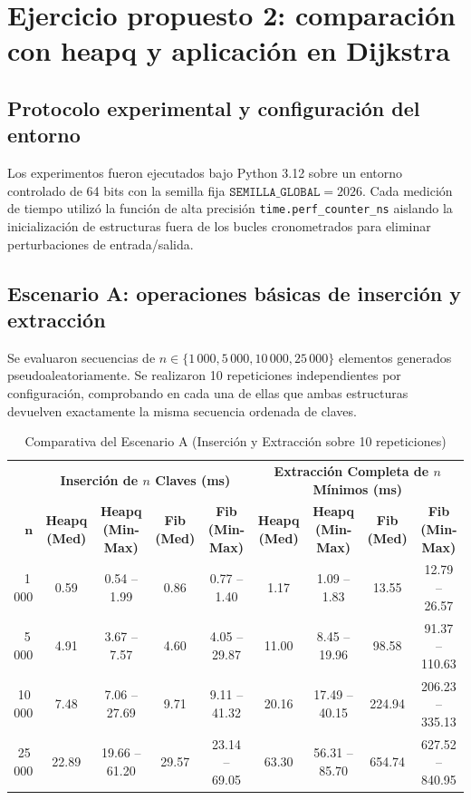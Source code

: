 \section{Ejercicio propuesto 2: comparación con heapq y aplicación en Dijkstra}

\subsection{Protocolo experimental y configuración del entorno}
Los experimentos fueron ejecutados bajo Python 3.12 sobre un entorno controlado de 64 bits con la semilla fija $\texttt{SEMILLA\_GLOBAL} = 2026$. Cada medición de tiempo utilizó la función de alta precisión \texttt{time.perf\_counter\_ns} aislando la inicialización de estructuras fuera de los bucles cronometrados para eliminar perturbaciones de entrada/salida.

\subsection{Escenario A: operaciones básicas de inserción y extracción}
Se evaluaron secuencias de $n \in \{1\,000, 5\,000, 10\,000, 25\,000\}$ elementos generados pseudoaleatoriamente. Se realizaron 10 repeticiones independientes por configuración, comprobando en cada una de ellas que ambas estructuras devuelven exactamente la misma secuencia ordenada de claves.

\begin{table}[H]
    \caption{Comparativa del Escenario A (Inserción y Extracción sobre 10 repeticiones)}
    \label{tab:escenario_a}
    \centering
    \scriptsize
    \begin{tabular*}{\textwidth}{@{\extracolsep{\fill}}rcccccccc}
        \toprule
        & \multicolumn{4}{c}{\textbf{Inserción de $n$ Claves (ms)}} & \multicolumn{4}{c}{\textbf{Extracción Completa de $n$ Mínimos (ms)}} \\
        \cmidrule(lr){2-5} \cmidrule(lr){6-9}
        $\mathbf{n}$ & \textbf{Heapq (Med)} & \textbf{Heapq (Min-Max)} & \textbf{Fib (Med)} & \textbf{Fib (Min-Max)} & \textbf{Heapq (Med)} & \textbf{Heapq (Min-Max)} & \textbf{Fib (Med)} & \textbf{Fib (Min-Max)} \\
        \midrule
        1\,000  & 0.59 & 0.54 -- 1.99  & 0.86  & 0.77 -- 1.40  & 1.17  & 1.09 -- 1.83  & 13.55  & 12.79 -- 26.57 \\
        5\,000  & 4.91 & 3.67 -- 7.57  & 4.60  & 4.05 -- 29.87 & 11.00 & 8.45 -- 19.96 & 98.58  & 91.37 -- 110.63 \\
        10\,000 & 7.48 & 7.06 -- 27.69 & 9.71  & 9.11 -- 41.32 & 20.16 & 17.49 -- 40.15 & 224.94 & 206.23 -- 335.13 \\
        25\,000 & 22.89 & 19.66 -- 61.20 & 29.57 & 23.14 -- 69.05 & 63.30 & 56.31 -- 85.70 & 654.74 & 627.52 -- 840.95 \\
        \bottomrule
    \end{tabular*}
\end{table}

